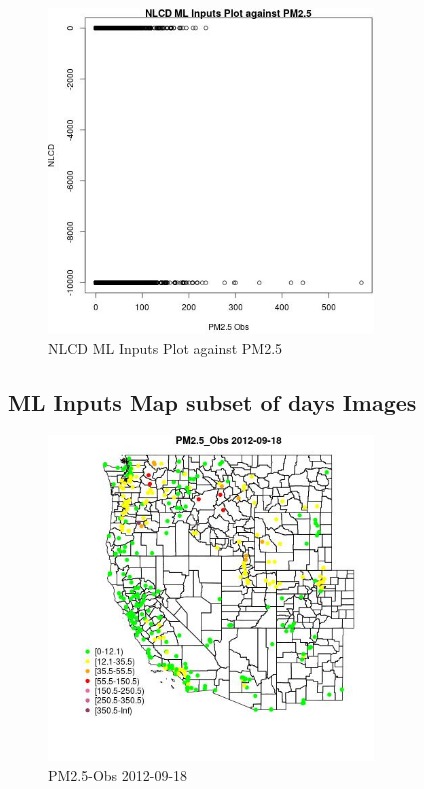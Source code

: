 \begin{figure} 
\centering  
\includegraphics[width=0.77\textwidth]{Code_Outputs/ML_input_report_ML_input_PM25_Step5_part_d_de_duplicated_aves_ML_input_NLCDvPM25_Obs.jpg} 
\caption{\label{fig:ML_input_report_ML_input_PM25_Step5_part_d_de_duplicated_aves_ML_inputNLCDvPM25_Obs}NLCD ML Inputs Plot against PM2.5} 
\end{figure} 
 

\subsection{ML Inputs Map subset of days Images} 
 

\begin{figure} 
\centering  
\includegraphics[width=0.77\textwidth]{Code_Outputs/ML_input_report_ML_input_PM25_Step5_part_d_de_duplicated_aves_ML_input_MapObsPM25_Obs2012-09-18.jpg} 
\caption{\label{fig:ML_input_report_ML_input_PM25_Step5_part_d_de_duplicated_aves_ML_inputMapObsPM25_Obs2012-09-18}PM2.5-Obs 2012-09-18} 
\end{figure} 
 

